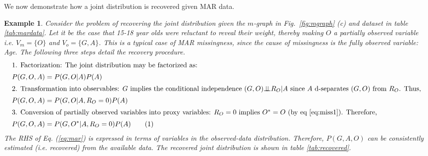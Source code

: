 \documentclass[12pt]{article}
\newcommand\numberthis{\addtocounter{equation}{1}\tag{\theequation}}
\newcommand{\compos}{\mbox{$\bot\!\!\!\bot$}}
\newtheorem{example}{Example}
\begin{document}
We now demonstrate how a joint distribution is recovered given MAR data.
\begin{example}
	Consider the problem of recovering the joint distribution given the $m$-graph in Fig.\ \ref{fig:mgraph} (c) and dataset in table \ref{tab:mardata}.  Let it be the case that 15-18 year olds were reluctant to reveal their weight, thereby making $O$ a partially observed variable i.e. $ V_m=\{O\}$ and $V_o=\{G,A\}$.  This is a typical case of MAR missingness, since the cause of missingness is the fully observed variable: Age. The following three steps detail the recovery procedure. 
	\begin{align*}
	\intertext{1. Factorization: The joint distribution may be factorized as:}
	P(G,O,A)&=P(G,O|A)P(A)\\
	\intertext{2. Transformation into observables:  $G$ implies the conditional independence $(G,O) \compos R_O |A$ since $A$ d-separates $(G,O)$ from $R_O$. Thus,}
	P(G,O,A)&=P(G,O|A,R_O=0)P(A) \\
	\intertext{3. Conversion of partially observed variables into proxy variables: 	$R_O=0$ implies $O^*=O$ (by eq \ref{eq:miss1}).  Therefore,}
	P(G,O,A)&=P(G,O^*|A,R_O=0)P(A) \numberthis \label{eq:mar}
	\end{align*}
	The RHS of Eq. (\ref{eq:mar}) is expressed in terms of variables  in the observed-data distribution. Therefore, $P (G,A,O) $ can be consistently estimated (i.e. recovered) from the available data. The recovered joint distribution is shown in table \ref{tab:recovered}. 
	\label{ex:mar}
\end{example}
\end{document}
